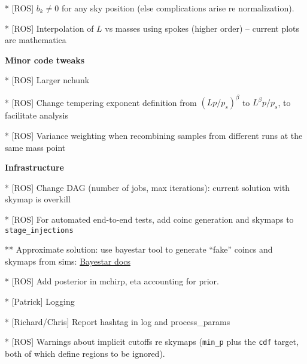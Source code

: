 *  [ROS]  $b_k \ne 0$ for any sky position (else complications arise re normalization).

* [ROS] Interpolation of $L$ vs masses using spokes (higher order) -- current plots are mathematica

\noindent \textbf{Minor code tweaks}

* [ROS] Larger nchunk

* [ROS] Change tempering exponent definition from $(Lp/p_s)^\beta$ to $L^\beta p/p_s$, to facilitate analysis

* [ROS] Variance weighting when recombining samples from different runs at the same mass point


\noindent \textbf{Infrastructure}

* [ROS] Change DAG (number of jobs, max iterations): current solution with skymap is overkill


* [ROS] For automated end-to-end tests, add \gstlal{} coinc generation and \BS{} skymaps to \texttt{stage\_injections}

** Approximate solution: use bayestar tool to generate ``fake'' coincs and skymaps from sims:
\href{https://www.lsc-group.phys.uwm.edu/ligovirgo/cbcnote/ParameterEstimationModelSelection/BAYESTARHowTo}{Bayestar docs}

* [ROS] Add posterior in mchirp, eta accounting for prior.

* [Patrick] Logging

* [Richard/Chris] Report hashtag in log and process\_params

* [ROS] Warnings about implicit cutoffs re skymaps (\texttt{min\_p} plus the \texttt{cdf} target, both of which define
regions to be ignored).
